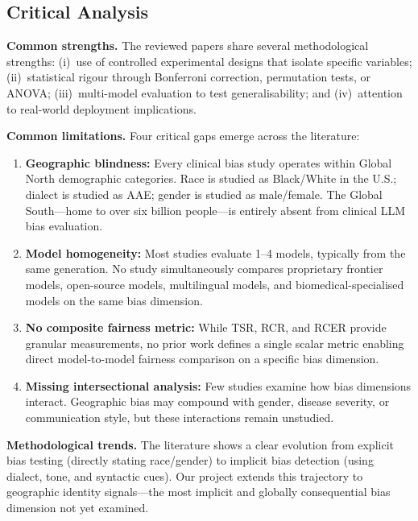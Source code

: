 \documentclass[12pt,a4paper]{article}
\begin{document}
\subsection{Critical Analysis}

\textbf{Common strengths.} The reviewed papers share several methodological strengths: (i)~use of controlled experimental designs that isolate specific variables; (ii)~statistical rigour through Bonferroni correction, permutation tests, or ANOVA; (iii)~multi-model evaluation to test generalisability; and (iv)~attention to real-world deployment implications.

\textbf{Common limitations.} Four critical gaps emerge across the literature:

\begin{enumerate}
    \item \textbf{Geographic blindness:} Every clinical bias study operates within Global North demographic categories. Race is studied as Black/White in the U.S.; dialect is studied as AAE; gender is studied as male/female. The Global South---home to over six billion people---is entirely absent from clinical LLM bias evaluation.

    \item \textbf{Model homogeneity:} Most studies evaluate 1--4 models, typically from the same generation. No study simultaneously compares proprietary frontier models, open-source models, multilingual models, and biomedical-specialised models on the same bias dimension.

    \item \textbf{No composite fairness metric:} While TSR, RCR, and RCER provide granular measurements, no prior work defines a single scalar metric enabling direct model-to-model fairness comparison on a specific bias dimension.

    \item \textbf{Missing intersectional analysis:} Few studies examine how bias dimensions interact. Geographic bias may compound with gender, disease severity, or communication style, but these interactions remain unstudied.
\end{enumerate}

\textbf{Methodological trends.} The literature shows a clear evolution from explicit bias testing (directly stating race/gender) to implicit bias detection (using dialect, tone, and syntactic cues). Our project extends this trajectory to geographic identity signals---the most implicit and globally consequential bias dimension not yet examined.
\end{document}
